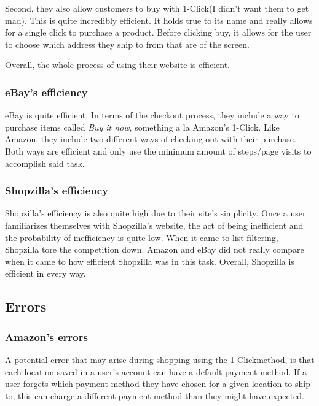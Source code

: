 \documentclass[11pt, oneside]{article}
\begin{document}
		Second, they also allow customers to buy with 1-Click\textregistered\hspace{2 mm}(I didn't want them to get mad). This is quite incredibly efficient. It holds true to its name and really allows for a single click to purchase a product. Before clicking buy, it allows for the user to choose which address they ship to from that are of the screen.

		Overall, the whole process of using their website is efficient.

		\subsubsection{eBay's efficiency}

		eBay is quite efficient. In terms of the checkout process, they include a way to purchase items called \textit{Buy it now}, something a la Amazon's 1-Click\textregistered. Like Amazon, they include two different ways of checking out with their purchase. Both ways are efficient and only use the minimum amount of steps/page visits to accomplish said task. 

		\subsubsection{Shopzilla's efficiency}
		Shopzilla's efficiency is also quite high due to their site's simplicity. Once a user familiarizes themselves with Shopzilla's website, the act of being inefficient and the probability of inefficiency is quite low. When it came to list filtering, Shopzilla tore the competition down. Amazon and eBay did not really compare when it came to how efficient Shopzilla was in this task. Overall, Shopzilla is efficient in every way.

	\subsection{Errors}

		\subsubsection{Amazon's errors}
		A potential error that may arise during shopping using the 1-Click\textregistered\hspace{2 mm}method, is that each location saved in a user's account can have a default payment method. If a user forgets which payment method they have chosen for a given location to ship to, this can charge a different payment method than they might have expected. 
\end{document}
